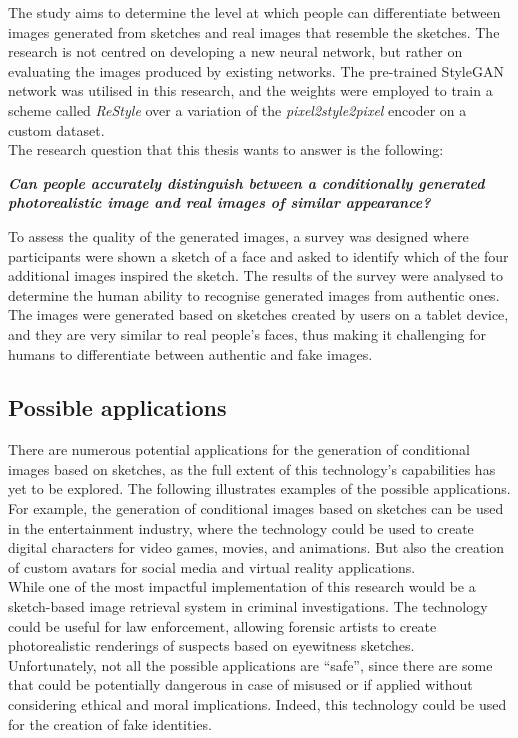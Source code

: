 \noindent The study aims to determine the level at which people can differentiate between images generated from sketches and real images that resemble the sketches. The research is not centred on developing a new neural network, but rather on evaluating the images produced by existing networks. The pre-trained StyleGAN network was utilised in this research, and the weights were employed to train a scheme called \textit{ReStyle} over a variation of the \textit{pixel2style2pixel} encoder on a custom dataset. \\
The research question that this thesis wants to answer is the following:
\begin{center}
    \textit{\textbf{Can people accurately distinguish between a conditionally generated photorealistic image and real images of similar appearance?}}
\end{center}

\noindent To assess the quality of the generated images, a survey was designed where participants were shown a sketch of a face and asked to identify which of the four additional images inspired the sketch. The results of the survey were analysed to determine the human ability to recognise generated images from authentic ones.
The images were generated based on sketches created by users on a tablet device, and they are very similar to real people's faces, thus making it challenging for humans to differentiate between authentic and fake images.

\subsection{Possible applications}
There are numerous potential applications for the generation of conditional images based on sketches, as the full extent of this technology's capabilities has yet to be explored. The following illustrates examples of the possible applications. For example, the generation of conditional images based on sketches can be used in the entertainment industry, where the technology could be used to create digital characters for video games, movies, and animations. But also the creation of custom avatars for social media and virtual reality applications.
\\
While one of the most impactful implementation of this research would be a sketch-based image retrieval system in criminal investigations. The technology could be useful for law enforcement, allowing forensic artists to create photorealistic renderings of suspects based on eyewitness sketches. \\
Unfortunately, not all the possible applications are “safe”, since there are some that could be potentially dangerous in case of misused or if applied without considering ethical and moral implications. Indeed, this technology could be used for the creation of fake identities.

